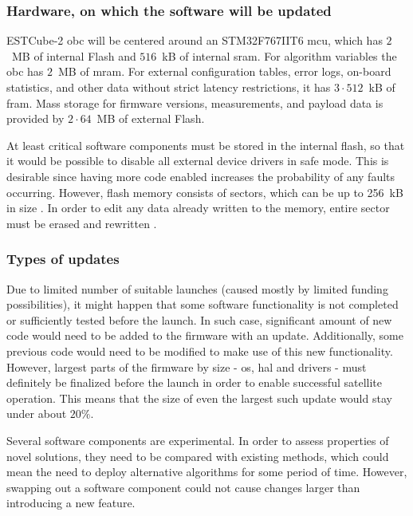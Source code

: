 \subsubsection{Hardware, on which the software will be updated}\label{s:hardware}

ESTCube-2 \gls{obc} will be centered around an STM32F767IIT6 \gls{mcu}, which has $2$~MB of internal Flash and $516$~kB of internal \gls{sram}. For algorithm variables the \gls{obc} has $2$~MB of \gls{mram}. For external configuration tables, error logs, on-board statistics, and other data without strict latency restrictions, it has $3\cdot512$~kB of \gls{fram}. Mass storage for firmware versions, measurements, and payload data is provided by $2\cdot64$~MB of external Flash.
\cite{Haljaste2017}

At least critical software components must be stored in the internal flash, so that it would be possible to disable all external device drivers in safe mode. This is desirable since having more code enabled increases the probability of any faults occurring. However, flash memory consists of sectors, which can be up to 256~kB in size \cite{STMicroelectronics2018}. In order to edit any data already written to the memory, entire sector must be erased and rewritten \cite{STMicroelectronics2018}.

\subsubsection{Types of updates}

Due to limited number of suitable launches (caused mostly by limited funding possibilities), it might happen that some software functionality is not completed or sufficiently tested before the launch. In such case, significant amount of new code would need to be added to the firmware with an update. Additionally, some previous code would need to be modified to make use of this new functionality. However, largest parts of the firmware by size - \gls{os}, \gls{hal} and drivers - must definitely be finalized before the launch in order to enable successful satellite operation. This means that the size of even the largest such update would stay under about $20\%$.

Several software components are experimental. In order to assess properties of novel solutions, they need to be compared with existing methods, which could mean the need to deploy alternative algorithms for some period of time. However, swapping out a software component could not cause changes larger than introducing a new feature.

